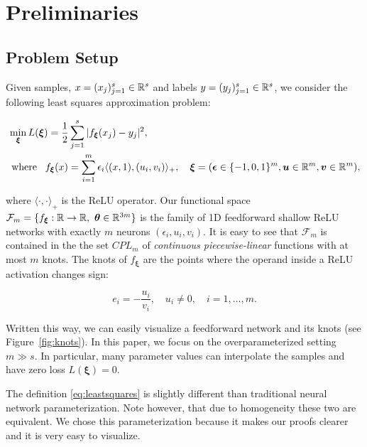 \section{Preliminaries}







\subsection{Problem Setup}


Given samples, $x = (x_j)_{j=1}^s \in \mathbb{R}^s$ and labels $y = (y_j)_{j=1}^s \in \mathbb{R}^s$, we consider the following least squares approximation problem:

\begin{equation}\label{eq:leastsquares}
\begin{aligned}
    &\min_{\bm \xi} L(\bm \xi) =  \frac{1}{2} \sum_{j=1}^s |f_{\bm \xi}(x_j) - y_j|^2,\\
    &\mbox{ where } \,\,\, f_{\bm \xi}(x) = \sum_{i=1}^m \epsilon_i \langle (x, 1), (u_i, v_i) \rangle_+, \quad \bm \xi = (\bm \epsilon \in \{-1, 0, 1\}^m, \bm u \in \mathbb{R}^m, \bm v \in \mathbb{R}^m),
\end{aligned}
\end{equation}

where $\langle \cdot, \cdot \rangle_+$ is the ReLU operator. Our functional space $\mathcal F_m = \{f_{\bm \xi}: \mathbb{R}\rightarrow \mathbb{R}, \, \,\textbf{} {\bm \theta} \in \mathbb{R}^{3m}\}$ is the family of 1D feedforward shallow ReLU networks with exactly $m$ neurons $(\epsilon_i, u_i, v_i)$. It is easy to see that $\mathcal F_m$ is contained in the the set $CPL_m$ of \emph{continuous piecewise-linear} functions with at most $m$ knots. The knots of $f_{\bm \xi}$ are the points where the operand inside a ReLU activation changes sign:

\begin{equation}\label{eq:knots}
e_i = -\frac{u_i}{v_i}, \quad u_i \ne 0, \quad i=1,\ldots,m.
\end{equation}

Written this way, we can easily visualize a feedforward network and its knots (see Figure~\ref{fig:knots}). In this paper, we focus on the overparameterized setting $m \gg s$. In particular, many parameter values can interpolate the samples and have zero loss $L(\bm \xi) = 0$.

\begin{remark}
The definition \eqref{eq:leastsquares} is slightly different than traditional neural network parameterization. Note however, that due to homogeneity these two are equivalent. We chose this parameterization because it makes our proofs clearer and it is very easy to visualize.
\end{remark}

